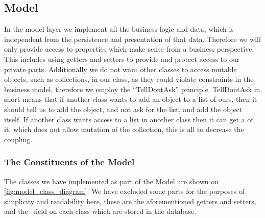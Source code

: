 \subsection{Model}\label{subsec:model}

In the model layer we implement all the business logic and data, which is independent from the persistence and presentation of that data. 
Therefore we will only provide access to properties which make sense from a business perspective.
This includes using getters and setters to provide and protect access to our private parts. %
Additionally we do not want other classes to access mutable objects, such as collections, in our class, as they could violate constraints in the business model, therefore we employ the ``TellDontAsk'' principle\cite{Fowler_TellDontAsk}.
TellDontAsk in short means that if another class wants to add an object to a list of ours, then it should tell us to add the object, and not ask for the list, and add the object itself. 
If another class wants access to a list in another class then it can get a  of it, which does not allow mutation of the collection, this is all to decrease the coupling.

\subsubsection*{The Constituents of the Model}
The classes we have implemented as part of the Model are shown on \cref{fig:model_class_diagram}.
We have excluded some parts for the purposes of simplicity and readability here, these are the aforementioned getters and setters, and the --field on each class which are stored in the database. 

